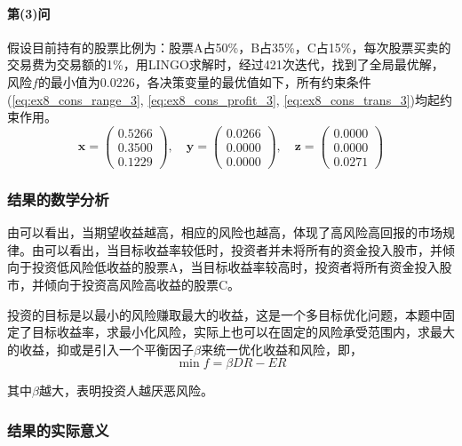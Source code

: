\documentclass[12pt,a4paper]{article}
\begin{document}
\paragraph{第(3)问} 假设目前持有的股票比例为：股票A占50\%，B占35\%，C占15\%，每次股票买卖的交易费为交易额的1\%，用LINGO求解时，经过421次迭代，找到了全局最优解，风险$f$的最小值为0.0226，各决策变量的最优值如下，所有约束条件(\ref{eq:ex8_cons_range_3}, \ref{eq:ex8_cons_profit_3}, \ref{eq:ex8_cons_trans_3})均起约束作用。
\begin{equation}
    \boldsymbol{x} = \left(\begin{matrix}
        0.5266\\
        0.3500\\
        0.1229
    \end{matrix}\right)
    ,\quad
    \boldsymbol{y} = \left(\begin{matrix}
        0.0266\\
        0.0000\\
        0.0000
    \end{matrix}\right)
    ,\quad 
    \boldsymbol{z} = \left(\begin{matrix}
        0.0000\\
        0.0000\\
        0.0271
    \end{matrix}\right)
\end{equation}

\subsubsection{结果的数学分析}

由可以看出，当期望收益越高，相应的风险也越高，体现了高风险高回报的市场规律。由可以看出，当目标收益率较低时，投资者并未将所有的资金投入股市，并倾向于投资低风险低收益的股票A，当目标收益率较高时，投资者将所有资金投入股市，并倾向于投资高风险高收益的股票C。

投资的目标是以最小的风险赚取最大的收益，这是一个多目标优化问题，本题中固定了目标收益率，求最小化风险，实际上也可以在固定的风险承受范围内，求最大的收益，抑或是引入一个平衡因子$\beta$来统一优化收益和风险，即，
\begin{equation}
    \min f = \beta DR - ER
\end{equation}

其中$\beta$越大，表明投资人越厌恶风险。

\subsubsection{结果的实际意义}
\end{document}
